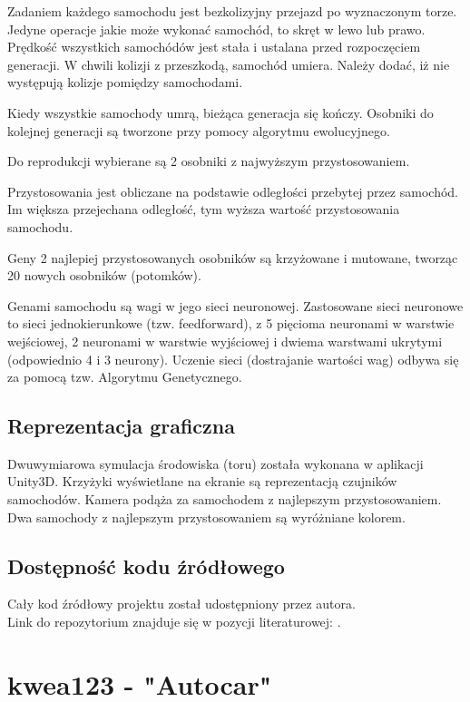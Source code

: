 Zadaniem każdego samochodu jest bezkolizyjny przejazd po wyznaczonym torze.
Jedyne operacje jakie może wykonać samochód, to skręt w lewo lub prawo.
Prędkość wszystkich samochódów jest stała i ustalana przed rozpoczęciem generacji.
W chwili kolizji z przeszkodą, samochód umiera.
Należy dodać, iż nie występują kolizje pomiędzy samochodami.

Kiedy wszystkie samochody umrą, bieżąca generacja się kończy.
Osobniki do kolejnej generacji są tworzone przy pomocy algorytmu ewolucyjnego.

Do reprodukcji wybierane są 2 osobniki z najwyższym przystosowaniem.

Przystosowania jest obliczane na podstawie odległości przebytej przez samochód.
Im większa przejechana odległość, tym wyższa wartość przystosowania samochodu.

Geny 2 najlepiej przystosowanych osobników są krzyżowane i mutowane, tworząc 20 nowych osobników (potomków).

Genami samochodu są wagi w jego sieci neuronowej.
Zastosowane sieci neuronowe to sieci jednokierunkowe (tzw. feedforward),
z 5 pięcioma neuronami w warstwie wejściowej, 2 neuronami w warstwie wyjściowej i dwiema warstwami ukrytymi (odpowiednio 4 i 3 neurony).
Uczenie sieci (dostrajanie wartości wag) odbywa się za pomocą tzw. Algorytmu Genetycznego.

\subsection{Reprezentacja graficzna}
Dwuwymiarowa symulacja środowiska (toru) została wykonana w aplikacji Unity3D.
Krzyżyki wyświetlane na ekranie są reprezentacją czujników samochodów.
Kamera podąża za samochodem z najlepszym przystosowaniem.
Dwa samochody z najlepszym przystosowaniem są wyróżniane kolorem.

\subsection{Dostępność kodu źródłowego}
Cały kod źródłowy projektu został udostępniony przez autora. \\
Link do repozytorium znajduje się w pozycji literaturowej:  \cite{artz:deepLearningCars:github}.

\newpage
\section{
	kwea123 - "Autocar"
	\cite{kwea:autocar}
}

